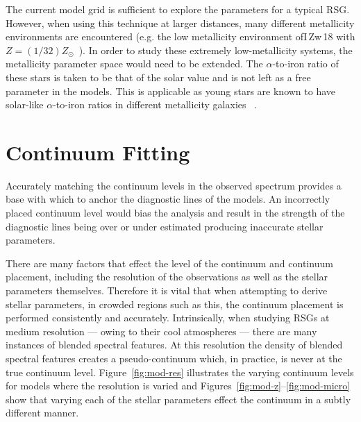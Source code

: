 The current model grid is sufficient to explore the parameters for a typical RSG.
However, when using this technique at larger distances,
many different metallicity environments are encountered (e.g. the low metallicity environment ofI\,Zw\,18 with $Z=(1/32)Z_{\odot}$~\citep{1998ApJ...508..248V}).
In order to study these extremely low-metallicity systems,
the metallicity parameter space would need to be extended.
The $\alpha$-to-iron ratio of these stars is taken to be that of the solar value and is not left as a free parameter in the models.
This is applicable as young stars are known to have solar-like $\alpha$-to-iron ratios in different metallicity galaxies
~\citep[see tables 3 and 4 in][and references therein]{2015ApJ...806...21D}.

\section{Continuum Fitting} %
\label{sub:continuum_fitting}

Accurately matching the continuum levels in the observed
spectrum provides a base with which to anchor the diagnostic lines of the models.
An incorrectly placed continuum level would bias the analysis and result in the
strength of the diagnostic lines being over or under estimated producing inaccurate stellar parameters.

There are many factors that effect the level of the continuum and continuum placement,
including the resolution of the observations as well as the stellar parameters themselves.
Therefore it is vital that when attempting to derive stellar parameters,
in crowded regions such as this, the continuum placement is performed
consistently and accurately.
Intrinsically, when studying RSGs at medium resolution --- owing  to their cool atmospheres ---
there are many instances of blended spectral features.
At this resolution the density of blended spectral features creates a pseudo-continuum which, in practice,
is never at the true continuum level.
Figure~\ref{fig:mod-res} illustrates the varying continuum levels for models where the resolution is varied and
Figures~\ref{fig:mod-z}--\ref{fig:mod-micro} show that varying each of the stellar parameters effect the continuum in a subtly different manner.

